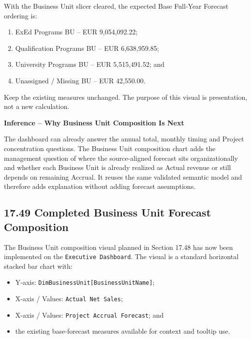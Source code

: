 \documentclass[11pt,a4paper]{article}
\begin{document}
With the Business Unit slicer cleared, the expected Base Full-Year Forecast
ordering is:

\begin{enumerate}[leftmargin=9mm,itemsep=2pt]
    \item ExEd Programs BU -- EUR 9,054,092.22;
    \item Qualification Programs BU -- EUR 6,638,959.85;
    \item University Programs BU -- EUR 5,515,491.52; and
    \item Unassigned / Missing BU -- EUR 42,550.00.
\end{enumerate}

Keep the existing measures unchanged. The purpose of this visual is presentation,
not a new calculation.

\begin{inferencebox}

\textbf{Inference -- Why Business Unit Composition Is Next}

The dashboard can already answer the annual total, monthly timing and Project
concentration questions. The Business Unit composition chart adds the management
question of where the source-aligned forecast sits organizationally and whether
each Business Unit is already realized as Actual revenue or still depends on
remaining Accrual. It reuses the same validated semantic model and therefore adds
explanation without adding forecast assumptions.

\end{inferencebox}




\subsection{17.49 Completed Business Unit Forecast Composition}

The Business Unit composition visual planned in Section 17.48 has now been
implemented on the \texttt{Executive Dashboard}. The visual is a standard
horizontal stacked bar chart with:

\begin{itemize}[leftmargin=7mm,itemsep=2pt]
    \item Y-axis: \texttt{DimBusinessUnit[BusinessUnitName]};
    \item X-axis / Values: \texttt{Actual Net Sales};
    \item X-axis / Values: \texttt{Project Accrual Forecast}; and
    \item the existing base-forecast measures available for context and tooltip use.
\end{itemize}
\end{document}
